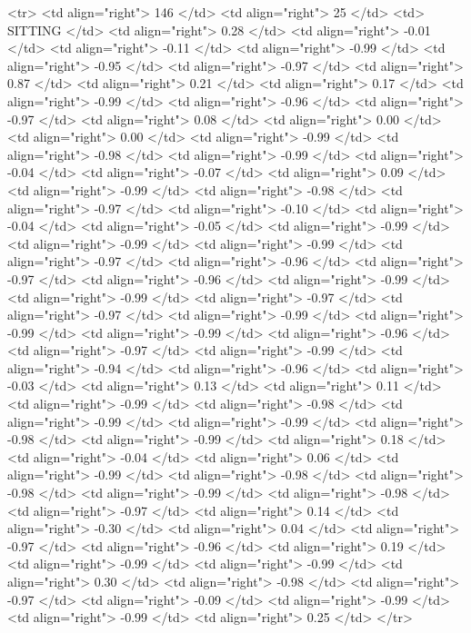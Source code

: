   <tr> <td align="right"> 146 </td> <td align="right">  25 </td> <td> SITTING </td> <td align="right"> 0.28 </td> <td align="right"> -0.01 </td> <td align="right"> -0.11 </td> <td align="right"> -0.99 </td> <td align="right"> -0.95 </td> <td align="right"> -0.97 </td> <td align="right"> 0.87 </td> <td align="right"> 0.21 </td> <td align="right"> 0.17 </td> <td align="right"> -0.99 </td> <td align="right"> -0.96 </td> <td align="right"> -0.97 </td> <td align="right"> 0.08 </td> <td align="right"> 0.00 </td> <td align="right"> 0.00 </td> <td align="right"> -0.99 </td> <td align="right"> -0.98 </td> <td align="right"> -0.99 </td> <td align="right"> -0.04 </td> <td align="right"> -0.07 </td> <td align="right"> 0.09 </td> <td align="right"> -0.99 </td> <td align="right"> -0.98 </td> <td align="right"> -0.97 </td> <td align="right"> -0.10 </td> <td align="right"> -0.04 </td> <td align="right"> -0.05 </td> <td align="right"> -0.99 </td> <td align="right"> -0.99 </td> <td align="right"> -0.99 </td> <td align="right"> -0.97 </td> <td align="right"> -0.96 </td> <td align="right"> -0.97 </td> <td align="right"> -0.96 </td> <td align="right"> -0.99 </td> <td align="right"> -0.99 </td> <td align="right"> -0.97 </td> <td align="right"> -0.97 </td> <td align="right"> -0.99 </td> <td align="right"> -0.99 </td> <td align="right"> -0.99 </td> <td align="right"> -0.96 </td> <td align="right"> -0.97 </td> <td align="right"> -0.99 </td> <td align="right"> -0.94 </td> <td align="right"> -0.96 </td> <td align="right"> -0.03 </td> <td align="right"> 0.13 </td> <td align="right"> 0.11 </td> <td align="right"> -0.99 </td> <td align="right"> -0.98 </td> <td align="right"> -0.99 </td> <td align="right"> -0.99 </td> <td align="right"> -0.98 </td> <td align="right"> -0.99 </td> <td align="right"> 0.18 </td> <td align="right"> -0.04 </td> <td align="right"> 0.06 </td> <td align="right"> -0.99 </td> <td align="right"> -0.98 </td> <td align="right"> -0.98 </td> <td align="right"> -0.99 </td> <td align="right"> -0.98 </td> <td align="right"> -0.97 </td> <td align="right"> 0.14 </td> <td align="right"> -0.30 </td> <td align="right"> 0.04 </td> <td align="right"> -0.97 </td> <td align="right"> -0.96 </td> <td align="right"> 0.19 </td> <td align="right"> -0.99 </td> <td align="right"> -0.99 </td> <td align="right"> 0.30 </td> <td align="right"> -0.98 </td> <td align="right"> -0.97 </td> <td align="right"> -0.09 </td> <td align="right"> -0.99 </td> <td align="right"> -0.99 </td> <td align="right"> 0.25 </td> </tr>
